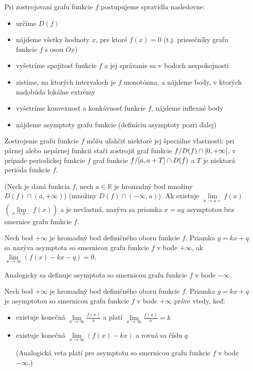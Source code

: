 Pri zostrojovaní grafu funkcie $f$ postupujeme spravidla nasledovne:
\begin{itemize}
\item
  určíme $D(f)$
\item
  nájdeme všetky hodnoty $x$, pre ktoré $f(x)=0$ (t.j. priesečníky grafu funkcie
  $f$ s osou $Ox$)
\item
  vyšetríme spojitosť funkcie $f$ a jej správanie sa v bodoch nespokojnosti
\item
  zistíme, na ktorých intervaloch je $f$ monotónna, a nájdeme body, v ktorých
  nadobúda lokálne extrémy
\item
  vyšetríme konvexnosť a konkávnosť funkcie $f$, nájdeme inflexné body
\item
  nájdeme asymptoty grafu funkcie (definíciu asymptoty pozri ďalej)
\end{itemize}
Zostrojenie grafu funkcie $f$ môžu uľahčiť niektoré jej špeciálne vlastnosti:
pri párnej alebo nepárnej funkcii stačí zostrojiť graf funkcie $f/D(f)\cap
\interval[open right]{0}{+\infty}$, v prípade periodickej funkcie $f$ graf
funkcie $f/\interval{a}{a + T} \cap D(f)$ a $T$ je niektorá perióda funkcie $f$.

(Nech je daná funkcia $f$, nech $a\in\mathbb{R}$ je hromadný bod množiny
$D(f)\cap (a,+\infty)$) (množiny $D(f)\cap (-\infty,a)$). Ak existuje
$\lim\limits_{x\rightarrow a+}f(x)$  $(\lim\limits_{x\rightarrow a-}f(x))$ a je nevlastná,
nazýva sa priamka $x=ay$ asymptotou bez smernice grafu funkcie $f$.

Nech bod $+\infty$ je hromadný bod definičného oboru funkcie $f$. Priamka
$y=kx+q$ sa nazýva asymptota so smernicou grafu funkcie $f$ v bode $+\infty$, ak
$\lim\limits_{x\rightarrow \infty}(f(x)-kx-q)=0$.

Analogicky sa definuje asymptota so smernicou grafu funkcie $f$ v bode
$-\infty$.

\begin{veta}
Nech bod $+\infty$ je hromadný bod definičného oboru funkcie $f$. Priamka
$y=kx+q$ je asymptotou so smernicou grafu funkcie $f$ v bode $+\infty$ práve
vtedy, keď:
\begin{itemize}
\item
  existuje konečná $\lim\limits_{x\rightarrow \infty} \frac{f(x)}{x}$ a platí
  $\lim\limits_{x\rightarrow \infty} \frac{f(x)}{x}=k$
\item
  existuje konečná $\lim\limits_{x\rightarrow \infty} (f(x)-kx)$ a rovná sa
  číslu $q$

(Analogická veta platí pre asymptotu so smernicou grafu funkcie $f$ v bode $-\infty$.)
\end{itemize}
\end{veta}

